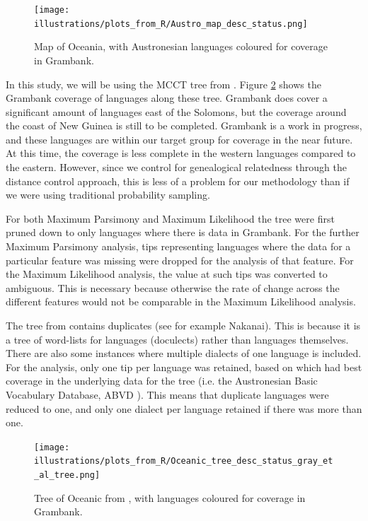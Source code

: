 \documentclass[draft,10pt]{article} %
\begin{document}
\begin{figure}
\centering
\texttt{[image: illustrations/plots\_from\_R/Austro\_map\_desc\_status.png]}
\caption{{Map of Oceania, with Austronesian languages coloured for coverage in Grambank.}}
\label{GB_austro_coverage}
\end{figure} %

In this study, we will be using the MCCT tree from \citet{grayetal_2009}. Figure \ref{tree_coverage_oceanic_gray} shows the Grambank coverage of languages along these tree. Grambank does cover a significant amount of languages east of the Solomons, but the coverage around the coast of New Guinea is still to be completed. Grambank is a work in progress, and these languages are within our target group for coverage in the near future. At this time, the coverage is less complete in the western languages compared to the eastern. However, since we control for genealogical relatedness through the distance control approach, this is less of a problem for our methodology than if we were using traditional probability sampling.

For both Maximum Parsimony and Maximum Likelihood the tree were first pruned down to only languages where there is data in Grambank. For the further Maximum Parsimony analysis, tips representing languages where the data for a particular feature was missing were dropped for the analysis of that feature. For the Maximum Likelihood analysis, the value at such tips was converted to ambiguous. This is necessary because otherwise the rate of change across the different features would not be comparable in the Maximum Likelihood analysis.

The tree from \citet{grayetal_2009} contains duplicates (see for example Nakanai). This is because it is a tree of word-lists for languages (doculects) rather than languages themselves. There are also some instances where multiple dialects of one language is included. For the analysis, only one tip per language was retained, based on which had best coverage in the underlying data for the tree (i.e. the Austronesian Basic Vocabulary Database, ABVD \citep{ABVD}). This means that duplicate languages were reduced to one, and only one dialect per language retained if there was more than one. 

\begin{figure}[H]
\centering
\texttt{[image: illustrations/plots\_from\_R/Oceanic\_tree\_desc\_status\_gray\_et\_al\_tree.png]}
\caption{{Tree of Oceanic from \citet{grayetal_2009}, with languages coloured for coverage in Grambank.}}
\label{tree_coverage_oceanic_gray}
\end{figure}
\end{document}
